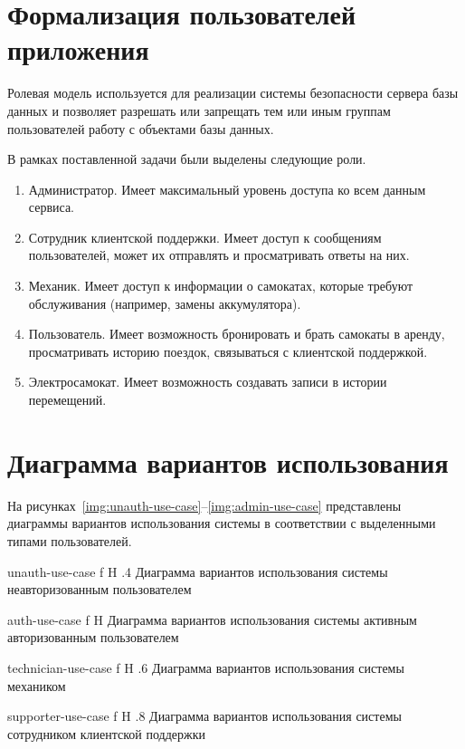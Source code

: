 \section{Формализация пользователей приложения}

Ролевая модель используется для реализации системы безопасности сервера базы данных и позволяет разрешать или запрещать тем или иным группам пользователей работу с объектами базы данных.

В рамках поставленной задачи были выделены следующие роли.

\begin{enumerate}
    \item Администратор. Имеет максимальный уровень доступа ко всем данным сервиса.
    \item Сотрудник клиентской поддержки. Имеет доступ к сообщениям пользователей, может их отправлять и просматривать ответы на них.
    \item Механик. Имеет доступ к информации о самокатах, которые требуют обслуживания (например, замены аккумулятора).
    \item Пользователь. Имеет возможность бронировать и брать самокаты в аренду, просматривать историю поездок, связываться с клиентской поддержкой.
    \item Электросамокат. Имеет возможность создавать записи в истории перемещений.
\end{enumerate}

\section{Диаграмма вариантов использования}

На рисунках~\ref{img:unauth-use-case}--\ref{img:admin-use-case} представлены диаграммы вариантов использования системы в соответствии с выделенными типами пользователей.

    {unauth-use-case}
    {f}
    {H}
    {.4\textwidth}
    {Диаграмма вариантов использования системы неавторизованным пользователем}

    {auth-use-case}
    {f}
    {H}
    {\textwidth}
    {Диаграмма вариантов использования системы активным авторизованным пользователем}

    {technician-use-case}
    {f}
    {H}
    {.6\textwidth}
    {Диаграмма вариантов использования системы механиком}

    {supporter-use-case}
    {f}
    {H}
    {.8\textwidth}
    {Диаграмма вариантов использования системы сотрудником клиентской поддержки}

